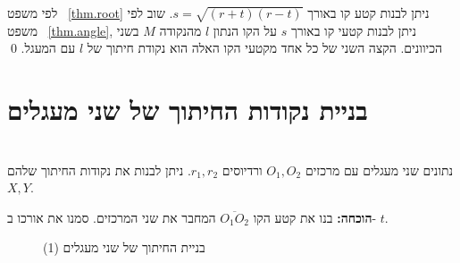 לפי משפט~%
\ref{thm.root}
ניתן לבנות קטע קו באורך
$s=\sqrt{(r+t)(r-t)}$.
שוב לפי משפט~%
\ref{thm.angle},
ניתן לבנות קטעי קו באורך 
$s$
על הקו הנתון
$l$
מהנקודה
$M$
בשני הכיוונים. הקצה השני של כל אחד מקטעי הקו האלה הוא נקודת חיתוך של 
$l$
עם המעגל.
\qed


\section{בניית נקודות החיתוך של שני מעגלים}\label{s.circle-circle}

\begin{theorem}\label{thm.two-circles}\mbox{}\\
נתונים שני מעגלים עם מרכזים
$O_1,O_2$
ורדיוסים
$r_1,r_2$.
ניתן לבנות את נקודות החיתוך שלהם
$X,Y$.
\end{theorem}
\textbf{הוכחה:}
בנו את קטע הקו
$\overline{O_1O_2}$
המחבר את שני המרכזים. סמנו את אורכו ב-%
$t$.

\begin{figure}[htb]
\begin{center}
\end{center}
\caption{בניית החיתוך של שני מעגלים (1)}\label{f.se-circle-circle1}
\end{figure}

